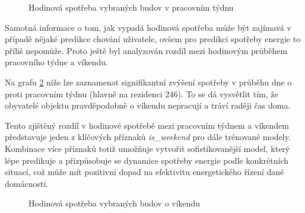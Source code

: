 \documentclass[FM,BP,fonts]{tulthesis}
\begin{document}
\begin{figure}[htbp]
	\centering
	\caption{Hodinová spotřeba vybraných budov v pracovním týdnu}
	\label{fig:hodina_pracovni}
\end{figure}

Samotná informace o tom, jak vypadá hodinová spotřeba může být zajímavá v případě nějaké predikce chování uživatele, ovšem pro predikci spotřeby energie to příliš nepomůže. Proto ještě byl analyzován rozdíl mezi hodinovým průběhem pracovního týdne a víkendu.

Na grafu \ref{fig:hodina_vikend} níže lze zaznamenat signifikantní zvýšení spotřeby v průběhu dne o proti pracovním týdnu (hlavně na rezidenci 246). To se dá vysvětlit tím, že obyvatelé objektu pravděpodobně o víkendu nepracují a tráví raději čas doma.


Tento zjištěný rozdíl v hodinové spotřebě mezi pracovním týdnem a víkendem představuje jeden z klíčových příznaků \textit{is\_weekend} pro dále trénované modely. Kombinace  více příznaků totiž umožňuje vytvořit sofistikovanější model, který lépe predikuje a přizpůsobuje se dynamice spotřeby energie podle konkrétních situací, což může mít pozitivní dopad na efektivitu energetického řízení dané domácnosti.


\newpage

\begin{figure}[htbp]
	\centering
	\caption{Hodinová spotřeba vybraných budov o víkendu}
	\label{fig:hodina_vikend}
\end{figure}
\end{document}
